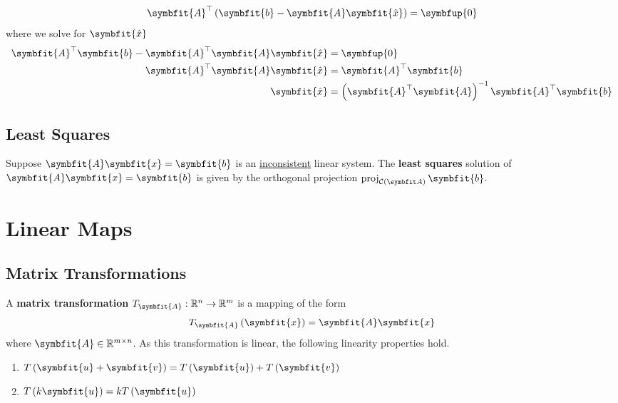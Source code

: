 \documentclass{article}
\begin{document}
\begin{solution}[Proof]
\begin{equation*}
        \symbfit{A}^\top \left( \symbfit{b}-\symbfit{A}\symbfit{\hat{x}} \right) = \symbfup{0}
    \end{equation*}
    where we solve for \(\symbfit{\hat{x}}\)
    \begin{align*}
        \symbfit{A}^\top \symbfit{b}-\symbfit{A}^\top \symbfit{A}\symbfit{\hat{x}} & = \symbfup{0}                                                                  \\
        \symbfit{A}^\top \symbfit{A}\symbfit{\hat{x}}                              & = \symbfit{A}^\top \symbfit{b}                                                 \\
        \symbfit{\hat{x}}                                                          & = \left( \symbfit{A}^\top \symbfit{A} \right)^{-1}\symbfit{A}^\top \symbfit{b}
    \end{align*}
\end{solution}
\subsection{Least Squares}
\begin{theorem}
    Suppose \(\symbfit{A}\symbfit{x}=\symbfit{b}\) is an
    \underline{inconsistent} linear system. The \textbf{least squares}
    solution of \(\symbfit{A}\symbfit{x}=\symbfit{b}\) is given by the
    orthogonal projection \(\proj_{\columnspace{A}}\symbfit{b}\).
\end{theorem}
\newpage
\section{Linear Maps}
\subsection{Matrix Transformations}
\begin{definition}
    A \textbf{matrix transformation}
    \(T_{\symbfit{A}}:\mathbb{R}^n\rightarrow \mathbb{R}^m\) is a
    mapping of the form
    \begin{equation*}
        T_{\symbfit{A}}\left(\symbfit{x}\right) = \symbfit{A}\symbfit{x}
    \end{equation*}
    where \(\symbfit{A}\in \mathbb{R}^{m \times n}\). As this
    transformation is linear, the following linearity properties hold.
    \begin{enumerate}
        \item \(T\left(\symbfit{u}+\symbfit{v}\right)=T\left(\symbfit{u}\right) + T\left(\symbfit{v}\right)\)
        \item \(T\left(k\symbfit{u}\right)= kT\left(\symbfit{u}\right)\)
    \end{enumerate}
\end{definition}
\end{document}
